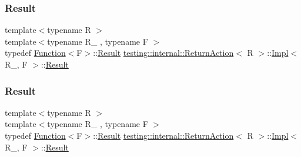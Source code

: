 \subsubsection{\texorpdfstring{Result}{Result}\hspace{0.1cm}{\footnotesize\ttfamily [1/3]}}
{\footnotesize\ttfamily template$<$typename R $>$ \\
template$<$typename R\+\_\+ , typename F $>$ \\
typedef \mbox{\hyperlink{structtesting_1_1internal_1_1_function}{Function}}$<$F$>$\+::\mbox{\hyperlink{classtesting_1_1_action_interface_a7477de2fe3e4e01c59db698203acaee7}{Result}} \mbox{\hyperlink{classtesting_1_1internal_1_1_return_action}{testing\+::internal\+::\+Return\+Action}}$<$ R $>$\+::\mbox{\hyperlink{classtesting_1_1internal_1_1_return_action_1_1_impl}{Impl}}$<$ R\+\_\+, F $>$\+::\mbox{\hyperlink{classtesting_1_1_action_interface_a7477de2fe3e4e01c59db698203acaee7}{Result}}}

\mbox{\label{classtesting_1_1internal_1_1_return_action_1_1_impl_a681fdf18258f86ea31efe0c55217e571}} 
\subsubsection{\texorpdfstring{Result}{Result}\hspace{0.1cm}{\footnotesize\ttfamily [2/3]}}
{\footnotesize\ttfamily template$<$typename R $>$ \\
template$<$typename R\+\_\+ , typename F $>$ \\
typedef \mbox{\hyperlink{structtesting_1_1internal_1_1_function}{Function}}$<$F$>$\+::\mbox{\hyperlink{classtesting_1_1_action_interface_a7477de2fe3e4e01c59db698203acaee7}{Result}} \mbox{\hyperlink{classtesting_1_1internal_1_1_return_action}{testing\+::internal\+::\+Return\+Action}}$<$ R $>$\+::\mbox{\hyperlink{classtesting_1_1internal_1_1_return_action_1_1_impl}{Impl}}$<$ R\+\_\+, F $>$\+::\mbox{\hyperlink{classtesting_1_1_action_interface_a7477de2fe3e4e01c59db698203acaee7}{Result}}}

\mbox{\label{classtesting_1_1internal_1_1_return_action_1_1_impl_a681fdf18258f86ea31efe0c55217e571}} 
